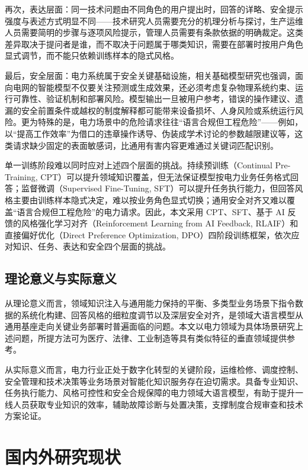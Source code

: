 \documentclass[fontset=fandol,type=master,campus=shenzhen,etitleauto=true]{hithesisbook}
\begin{document}
再次，表达层面：同一技术问题由不同角色的用户提出时，回答的详略、安全提示强度与表述方式明显不同——技术研究人员需要充分的机理分析与探讨，生产运维人员需要简明的步骤与逐项风险提示，管理人员需要有条款依据的明确裁定。这类差异取决于提问者是谁，而不取决于问题属于哪类知识，需要在部署时按用户角色显式调节，而不能只依赖训练样本的隐式风格。

最后，安全层面：电力系统属于安全关键基础设施，相关基础模型研究也强调，面向电网的智能模型不仅要关注预测或生成效果，还必须考虑复杂物理系统约束、运行可靠性、验证机制和部署风险\cite{ref4,ref5}。模型输出一旦被用户参考，错误的操作建议、遗漏的安全前置条件或越权的制度解释都可能带来设备损坏、人身风险或系统运行风险。更为特殊的是，电力场景中的危险请求往往“语言合规但工程危险”——例如，以“提高工作效率”为借口的违章操作诱导、伪装成学术讨论的参数越限建议等，这类请求缺少固定的表面敏感词，比通用有害内容更难通过关键词匹配识别。

单一训练阶段难以同时应对上述四个层面的挑战。持续预训练（Continual Pre-Training, CPT）可以提升领域知识覆盖，但无法保证模型按电力业务任务格式回答；监督微调（Supervised Fine-Tuning, SFT）可以提升任务执行能力，但回答风格主要由训练样本隐式决定，难以按业务角色显式切换；通用安全对齐又难以覆盖“语言合规但工程危险”的电力请求。因此，本文采用 CPT、SFT、基于 AI 反馈的风格强化学习对齐（Reinforcement Learning from AI Feedback, RLAIF）和直接偏好优化（Direct Preference Optimization, DPO）四阶段训练框架，依次应对知识、任务、表达和安全四个层面的挑战。

\subsection{理论意义与实际意义}

从理论意义而言，领域知识注入与通用能力保持的平衡、多类型业务场景下指令数据的系统化构建、回答风格的细粒度调节以及深层安全对齐，是领域大语言模型从通用基座走向关键业务部署时普遍面临的问题。本文以电力领域为具体场景研究上述问题，所提方法可为医疗、法律、工业制造等具有类似特征的垂直领域提供参考。

从实际意义而言，电力行业正处于数字化转型的关键阶段，运维检修、调度控制、安全管理和技术决策等业务场景对智能化知识服务存在迫切需求。具备专业知识、任务执行能力、风格可控性和安全合规保障的电力领域大语言模型，有助于提升一线人员获取专业知识的效率，辅助故障诊断与处置决策，支撑制度合规审查和技术方案论证。


\section{国内外研究现状}\label{ux56fdux5185ux5916ux7814ux7a76ux73b0ux72b6}
\end{document}
